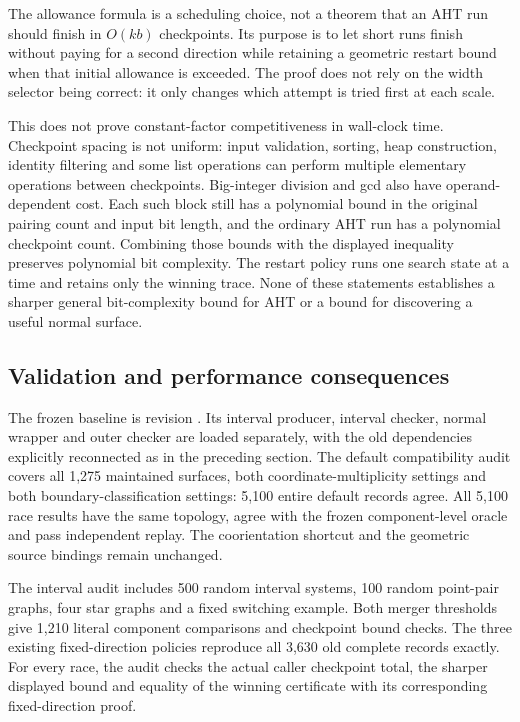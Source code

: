 The allowance formula is a scheduling choice, not a theorem that an AHT
run should finish in $O(kb)$ checkpoints. Its purpose is to let short runs
finish without paying for a second direction while retaining a geometric
restart bound when that initial allowance is exceeded. The proof does not
rely on the width selector being correct: it only changes which attempt
is tried first at each scale.

This does not prove constant-factor competitiveness in wall-clock time.
Checkpoint spacing is not uniform: input validation, sorting, heap
construction, identity filtering and some list operations can perform
multiple elementary operations between checkpoints. Big-integer division
and gcd also have operand-dependent cost. Each such block still has a
polynomial bound in the original pairing count and input bit length, and
the ordinary AHT run has a polynomial checkpoint count. Combining those
bounds with the displayed inequality preserves polynomial bit complexity.
The restart policy runs one search state at a time and retains only the
winning trace. None of these statements establishes a sharper general
bit-complexity bound for AHT or a bound for discovering a useful normal surface.

\subsection{Validation and performance consequences}

The frozen baseline is revision . Its interval producer,
interval checker, normal wrapper and outer checker are loaded separately,
with the old dependencies explicitly reconnected as in the preceding
section. The default compatibility audit covers all 1,275 maintained
surfaces, both coordinate-multiplicity settings and both boundary-classification
settings: 5,100 entire default records agree. All 5,100 race results have
the same topology, agree with the frozen component-level oracle and pass
independent replay. The coorientation shortcut and the geometric source
bindings remain unchanged.

The interval audit includes 500 random interval systems, 100 random
point-pair graphs, four star graphs and a fixed switching example. Both
merger thresholds give 1,210 literal component comparisons and checkpoint
bound checks. The three existing fixed-direction policies reproduce all
3,630 old complete records exactly. For every race, the audit checks the
actual caller checkpoint total, the sharper displayed bound and equality
of the winning certificate with its corresponding fixed-direction proof.

